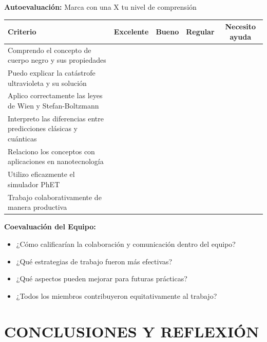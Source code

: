 \documentclass[12pt,a4paper]{article}
\begin{document}
	\begin{evaluacionbox}
		\textbf{Autoevaluación:} Marca con una X tu nivel de comprensión
		
		\begin{center}
			\begin{tabular}{|p{6cm}|c|c|c|c|}
				\hline
				\textbf{Criterio} & \textbf{Excelente} & \textbf{Bueno} & \textbf{Regular} & \textbf{Necesito ayuda} \\
				\hline
				Comprendo el concepto de cuerpo negro y sus propiedades & & & & \\
				\hline
				Puedo explicar la catástrofe ultravioleta y su solución & & & & \\
				\hline
				Aplico correctamente las leyes de Wien y Stefan-Boltzmann & & & & \\
				\hline
				Interpreto las diferencias entre predicciones clásicas y cuánticas & & & & \\
				\hline
				Relaciono los conceptos con aplicaciones en nanotecnología & & & & \\
				\hline
				Utilizo eficazmente el simulador PhET & & & & \\
				\hline
				Trabajo colaborativamente de manera productiva & & & & \\
				\hline
			\end{tabular}
		\end{center}
		
		\textbf{Coevaluación del Equipo:}
		\begin{itemize}
			\item ¿Cómo calificarían la colaboración y comunicación dentro del equipo? \hrulefill
			\item ¿Qué estrategias de trabajo fueron más efectivas? \hrulefill
			\item ¿Qué aspectos pueden mejorar para futuras prácticas? \hrulefill
			\item ¿Todos los miembros contribuyeron equitativamente al trabajo? \hrulefill
		\end{itemize}
	\end{evaluacionbox}
	
	
	\section{CONCLUSIONES Y REFLEXIÓN}
	
\end{document}
